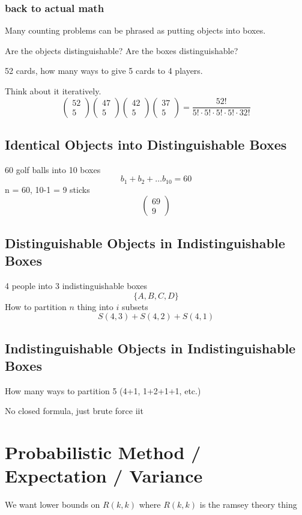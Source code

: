\documentclass{report}
\begin{document}
\subsection*{back to actual math}
Many counting problems can be phrased as putting objects into boxes.

Are the objects distinguishable? Are the boxes distinguishable?

52 cards, how many ways to give 5 cards to 4 players.

Think about it iteratively.
\[
\begin{pmatrix} 52 \\ 5 \end{pmatrix}
\begin{pmatrix} 47 \\ 5 \end{pmatrix}
\begin{pmatrix} 42 \\ 5 \end{pmatrix}
\begin{pmatrix} 37 \\ 5 \end{pmatrix}
=
\frac{52!}
{5! \cdot 5! \cdot 5! \cdot 5! \cdot 32!}
\]


\section{Identical Objects into Distinguishable Boxes}
60 golf balls into 10 boxes
\[
b_1 + b_2 + \ldots b_10 = 60
\]
n = 60, 10-1 = 9 sticks
\[
\begin{pmatrix}69 \\ 9 \end{pmatrix}
\]

\section{Distinguishable Objects in Indistinguishable Boxes}
4 people into 3 indistinguishable boxes
\[
\{ A, B, C, D \}
\]
How to partition $n$ thing into $i$ subsets
\[
S(4, 3) + S(4, 2) + S(4, 1)
\]


\section{Indistinguishable Objects in Indistinguishable Boxes}
How many ways to partition 5
(4+1, 1+2+1+1, etc.)

No closed formula, just brute force iit


\chapter{Probabilistic Method / Expectation / Variance}
We want lower bounds on $R(k,k)$ where $R(k,k)$ is the ramsey theory thing
\end{document}

